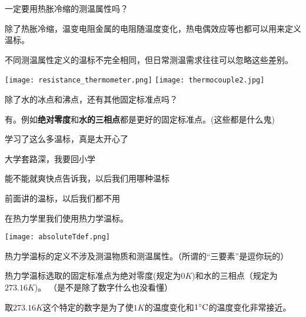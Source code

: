\documentclass[CJK]{beamer}
\begin{document}
\begin{frame}
\bch
一定要用热胀冷缩的测温属性吗？

\skipline

\bitem
\item{除了热胀冷缩，温变电阻金属的电阻随温度变化，热电偶效应等也都可以用来定义温标。}
\item{不同测温属性定义的温标不完全相同，但日常测温需求往往可以忽略这些差别。}
\eitem

\bcenter
\texttt{[image: resistance\_thermometer.png]}\hspace{0.1in}
\texttt{[image: thermocouple2.jpg]}
\ecenter
\ech
\end{frame}


\begin{frame}
\bch
除了水的冰点和沸点，还有其他固定标准点吗？

\skipline

\bitem
\item{有。例如{\bf 绝对零度}和{\bf 水的三相点}都是更好的固定标准点。(\wulian 这些都是什么鬼)}
\eitem

\ech
\end{frame}

\begin{frame}
\bch
学习了这么多温标，真是太开心了\wulian

\skiplines

大学套路深，我要回小学\wulian

\skiplines

能不能就爽快点告诉我，以后我们用哪种温标\wulian

\ech
\end{frame}


\begin{frame}
\bch
前面讲的温标，以后我们都不用\bye
\ech
\end{frame}

\begin{frame}
\bch
在热力学里我们使用热力学温标。

\texttt{[image: absoluteTdef.png]}
\bitem
\item{热力学温标的定义不涉及测温物质和测温属性。{\small \darkgray（所谓的“三要素”是逗你玩的\bye）}}
\item{热力学温标选取的固定标准点为绝对零度(规定为$0K$)和水的三相点（规定为$273.16K$)。 {\small \darkgray（是不是除了数字什么也没看懂\bye）}}
\eitem

{\small
取$273.16K$这个特定的数字是为了使$1K$的温度变化和$1^\circ \mathrm{C}$的温度变化非常接近。}
\ech
\end{frame}
\end{document}
